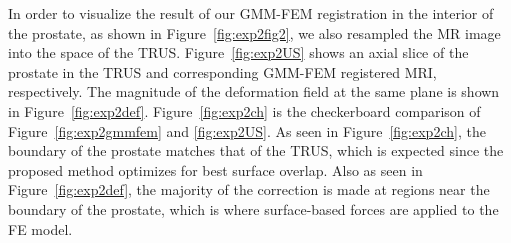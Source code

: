 \documentclass[journal]{IEEEtran}
\begin{document}
In order to visualize the result of our GMM-FEM registration in the interior of the prostate, as shown in Figure~\ref{fig:exp2fig2}, we also resampled the MR image into the space of the TRUS. Figure~\ref{fig:exp2US} shows an axial slice of the prostate in the TRUS and corresponding GMM-FEM registered MRI, respectively. The magnitude of the deformation field at the same plane is shown in Figure~\ref{fig:exp2def}. Figure~\ref{fig:exp2ch} is the checkerboard comparison of Figure~\ref{fig:exp2gmmfem} and \ref{fig:exp2US}. As seen in Figure~\ref{fig:exp2ch}, the boundary of the prostate matches that of the TRUS, which is expected since the proposed method optimizes for best surface overlap. Also as seen in Figure~\ref{fig:exp2def}, the majority of the correction is made at regions near the boundary of the prostate, which is where surface-based forces are applied to the FE model.
\end{document}
